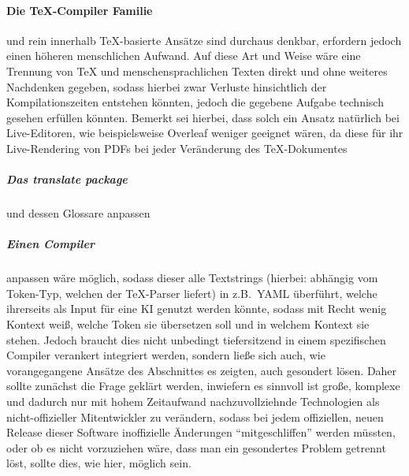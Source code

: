 \paragraph*{Die \TeX{}-Compiler Familie} und rein innerhalb \TeX{}-basierte Ansätze sind durchaus denkbar, erfordern jedoch einen höheren menschlichen Aufwand. Auf diese Art und Weise wäre eine Trennung von \TeX{} und menschensprachlichen Texten direkt und ohne weiteres Nachdenken gegeben, sodass hierbei zwar Verluste hinsichtlich der Kompilationszeiten entstehen könnten, jedoch die gegebene Aufgabe technisch gesehen erfüllen könnten. Bemerkt sei hierbei, dass solch ein Ansatz natürlich bei Live-Editoren, wie beispielsweise Overleaf weniger geeignet wären, da diese für ihr Live-Rendering von PDFs bei jeder Veränderung des \TeX{}-Dokumentes 
\subparagraph*{Das translate package} und dessen Glossare anpassen
\subparagraph*{Einen Compiler} anpassen wäre möglich, sodass dieser alle Textstrings (hierbei: abhängig vom Token-Typ, welchen der \TeX{}-Parser liefert) in z.B.\ YAML überführt, welche ihrerseits als Input für eine KI genutzt werden könnte, sodass mit Recht wenig Kontext weiß, welche Token sie übersetzen soll und in welchem Kontext sie stehen. Jedoch braucht dies nicht unbedingt tiefersitzend in einem spezifischen Compiler verankert integriert werden, sondern ließe sich auch, wie vorangegangene Ansätze des Abschnittes es zeigten, auch gesondert lösen. Daher sollte zunächst die Frage geklärt werden, inwiefern es sinnvoll ist große, komplexe und dadurch nur mit hohem Zeitaufwand nachzuvollziehnde Technologien als nicht-offizieller Mitentwickler zu verändern, sodass bei jedem offiziellen, neuen Release dieser Software inoffizielle Änderungen \enquote{mitgeschliffen} werden müssten, oder ob es nicht vorzuziehen wäre, dass man ein gesondertes Problem getrennt löst, sollte dies, wie hier, möglich sein.%

